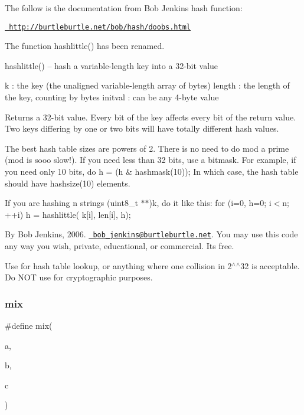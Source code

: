 The follow is the documentation from Bob Jenkin\textquotesingle{}s hash function\+:

\href{http://burtleburtle.net/bob/hash/doobs.html}{\texttt{ http\+://burtleburtle.\+net/bob/hash/doobs.\+html}}

The function hashlittle() has been renamed.

hashlittle() -- hash a variable-\/length key into a 32-\/bit value

k \+: the key (the unaligned variable-\/length array of bytes) length \+: the length of the key, counting by bytes initval \+: can be any 4-\/byte value

Returns a 32-\/bit value. Every bit of the key affects every bit of the return value. Two keys differing by one or two bits will have totally different hash values.

The best hash table sizes are powers of 2. There is no need to do mod a prime (mod is sooo slow!). If you need less than 32 bits, use a bitmask. For example, if you need only 10 bits, do h = (h \& hashmask(10)); In which case, the hash table should have hashsize(10) elements.

If you are hashing n strings (uint8\+\_\+t $\ast$$\ast$)k, do it like this\+: for (i=0, h=0; i$<$n; ++i) h = hashlittle( k\mbox{[}i\mbox{]}, len\mbox{[}i\mbox{]}, h);

By Bob Jenkins, 2006. \href{mailto:bob_jenkins@burtleburtle.net}{\texttt{ bob\+\_\+jenkins@burtleburtle.\+net}}. You may use this code any way you wish, private, educational, or commercial. It\textquotesingle{}s free.

Use for hash table lookup, or anything where one collision in 2$^\wedge$$^\wedge$32 is acceptable. Do N\+OT use for cryptographic purposes. \mbox{\label{rtems-rfs-dir-hash_8c_afd9fa1747724ec6142812721997394c3}} 
\subsubsection{\texorpdfstring{mix}{mix}}
{\footnotesize\ttfamily \#define mix(\begin{DoxyParamCaption}\item[{}]{a,  }\item[{}]{b,  }\item[{}]{c }\end{DoxyParamCaption})}

